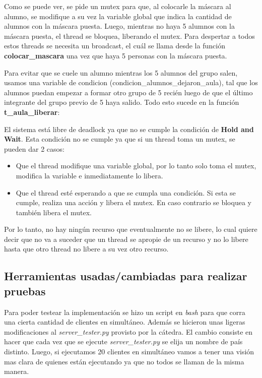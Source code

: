 Como se puede ver, se pide un mutex para que, al colocarle la m\'ascara al alumno, se modifique a su vez la variable global que indica la cantidad de alumnos con la m\'ascara puesta. Luego, mientras no haya 5 alumnos con la m\'ascara puesta, el 
thread se bloquea, liberando el mutex. Para despertar a todos estos threads se necesita un broadcast, el cu\'al se llama desde la funci\'on \textbf{colocar\_mascara} una vez que haya 5 personas con la 
m\'ascara puesta.



\newpage

 Para evitar que se cuele un alumno mientras los 5 alumnos del grupo salen, usamos una variable de condicion (condicion\_alumnos\_dejaron\_aula), tal que los alumnos puedan 
empezar a formar otro grupo de 5 reci\'en luego de que el \'ultimo integrante del grupo previo de 5 haya salido.
Todo esto sucede en la funci\'on \textbf{t\_aula\_liberar}:




El sistema est\'a libre de deadlock ya que no se cumple la condici\'on de \textbf{Hold and Wait}. Esta condici\'on no se cumple ya que si un thread toma un mutex,
se pueden dar 2 casos:

\begin{itemize}
 \item Que el thread modifique una variable global, por lo tanto solo toma el mutex, modifica la variable e inmediatamente lo libera.
 \item Que el thread est\'e esperando a que se cumpla una condici\'on. Si esta se cumple, realiza una acci\'on y libera el mutex. En caso contrario se bloquea y tambi\'en libera el mutex.
\end{itemize}

Por lo tanto, no hay ning\'un recurso que eventualmente no se libere, lo cual quiere decir que no va a suceder que un thread se apropie de un recurso y no lo libere hasta que otro thread
no libere a su vez otro recurso.



\subsection{Herramientas usadas/cambiadas para realizar pruebas}
Para poder testear la implementaci\'on se hizo un script en \emph{bash} para que corra una cierta cantidad de clientes en simult\'aneo. Adem\'as se hicieron unas ligeras modificaciones al \emph{server\_tester.py} provisto por la c\'atedra. El cambio consiste en hacer que cada vez que se ejecute \emph{server\_tester.py} se elija un nombre de pa\'is distinto. Luego, si ejecutamos 20 clientes en simult\'aneo vamos a tener una visi\'on mas clara de quienes est\'an ejecutando ya que no todos se llaman de la misma manera.

